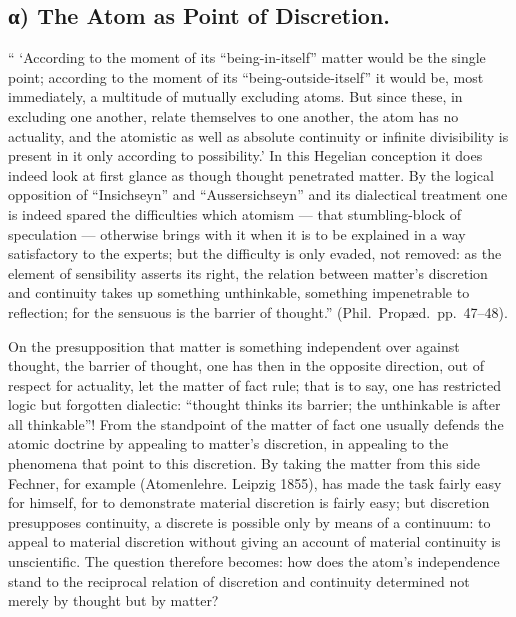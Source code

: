 \documentclass[12pt,a4paper]{book}
\begin{document}
\subsection*{α) The Atom as Point of Discretion.}

`` `According to the moment of its ``being-in-itself'' matter would be the
single point; according to the moment of its ``being-outside-itself'' it would
be, most immediately, a multitude of mutually excluding atoms. But since these,
in excluding one another, relate themselves to one another, the atom has no
actuality, and the atomistic as well as absolute continuity or infinite
divisibility is present in it only according to possibility.' In this Hegelian
conception it does indeed look at first glance as though thought penetrated
matter. By the logical opposition of ``Insichseyn'' and ``Aussersichseyn'' and
its dialectical treatment one is indeed spared the difficulties which atomism
--- that stumbling-block of speculation --- otherwise brings with it when it is
to be explained in a way satisfactory to the experts; but the difficulty is
only evaded, not removed: as the element of sensibility asserts its right, the
relation between matter's discretion and continuity takes up something
unthinkable, something impenetrable to reflection; for the sensuous is the
barrier of thought.'' (Phil.\ Propæd.\ pp.~47--48).

On the presupposition that matter is something independent over against
thought, the barrier of thought, one has then in the opposite direction, out of
respect for actuality, let the matter of fact rule; that is to say, one has
restricted logic but forgotten dialectic: ``thought thinks its barrier; the
unthinkable is after all thinkable''! From the standpoint of the matter of fact
one usually defends the atomic doctrine by appealing to matter's discretion, in
appealing to the phenomena that point to this discretion. By taking the matter
from this side Fechner, for example (Atomenlehre. Leipzig 1855), has made the
task fairly easy for himself, for to demonstrate material discretion is fairly
easy; but discretion presupposes continuity, a discrete is possible only by
means of a continuum: to appeal
to material discretion without giving an account of material continuity is
unscientific. The question therefore becomes: how does the atom's independence
stand to the reciprocal relation of discretion and continuity determined not
merely by thought but by matter?
\end{document}
